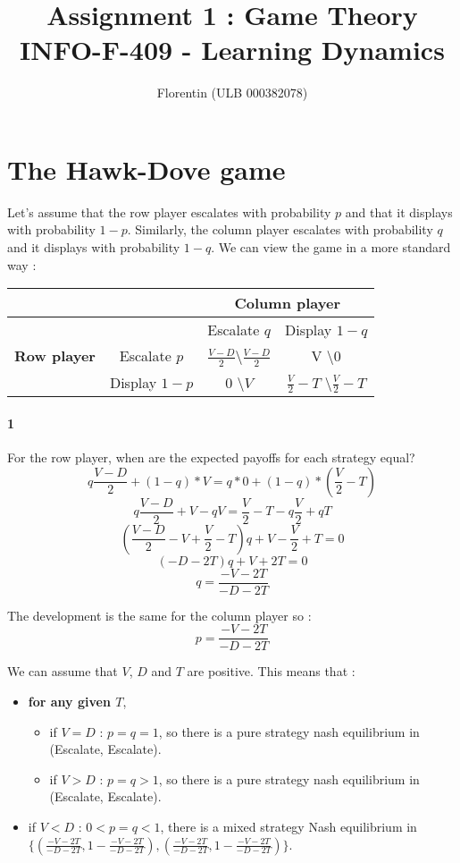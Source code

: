 \documentclass[a4paper]{article}
\title{
    Assignment 1 : Game Theory\\
    \small INFO-F-409 - Learning Dynamics
}
\author{Florentin \bsc{Hennecker} (ULB 000382078)}
\date{}
\begin{document}
\maketitle

\section{The Hawk-Dove game}
Let's assume that the row player escalates with probability $p$ and that it 
displays with probability $1-p$. Similarly, the column player escalates with 
probability $q$ and it displays with probability $1-q$. We can view the game
in a more standard way :

\begin{table}[H]
\begin{tabular}{c|c|c|c}
	& & \multicolumn{2}{c}{\textbf{Column player}} \\
	\hline
	& & Escalate $q$ & Display $1-q$ \\
	\textbf{Row player} & Escalate $p$ & 
		$\frac{V-D}{2}$\textbackslash$\frac{V-D}{2}$ & 
		V \textbackslash $0$\\
	\cline{2-3} & Display $1-p$ & $0$ \textbackslash $V$ &
		$\frac{V}{2}-T$ \textbackslash $\frac{V}{2}-T$\\
\end{tabular}
\end{table}

\paragraph{1} For the row player, when are the expected payoffs for each 
strategy equal?
$$ q\frac{V-D}{2} + (1-q)*V = q*0 + (1-q)*(\frac{V}{2}-T) $$
$$ q\frac{V-D}{2}+V-qV = \frac{V}{2}-T -q\frac{V}{2} + qT $$
$$ (\frac{V-D}{2} - V + \frac{V}{2} - T)q + V - \frac{V}{2} + T = 0 $$
$$ (-D-2T)q + V+2T = 0 $$
$$ q = \frac{-V-2T}{-D-2T} $$

The development is the same for the column player so :
$$ p = \frac{-V-2T}{-D-2T} $$

We can assume that $V$, $D$ and $T$ are positive. This means that :
\begin{itemize}
	\item \textbf{for any given $T$}, \begin{itemize}
			\item if $V = D$ : $p = q = 1$, so there is a pure 
				strategy nash equilibrium in (Escalate,
				Escalate).
			\item if $V > D$ : $ p = q > 1 $, so there is a pure
				strategy nash equilibrium in (Escalate, 
				Escalate).
		\end{itemize}	
	\item if $V < D$ : $ 0 < p = q < 1 $, there is a mixed strategy Nash
		equilibrium in \\
		$\{( \frac{-V-2T}{-D-2T}, 1-\frac{-V-2T}{-D-2T}), 
		( \frac{-V-2T}{-D-2T}, 1-\frac{-V-2T}{-D-2T})\}$. 
\end{itemize}
\end{document}
